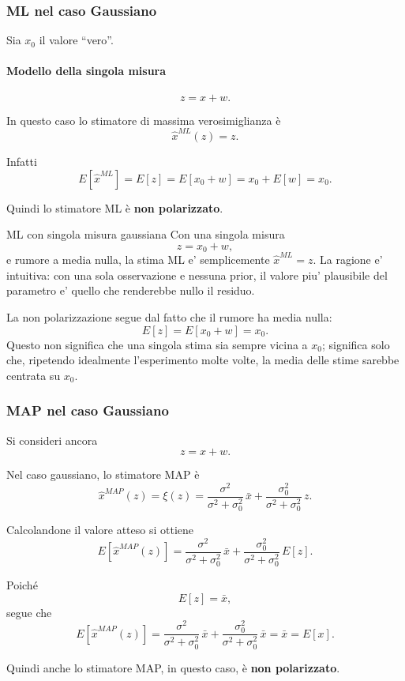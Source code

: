 \documentclass[11pt,a4paper]{article}
\begin{document}
\subsubsection*{ML nel caso Gaussiano}

Sia \(x_0\) il valore ``vero''.

\paragraph{Modello della singola misura}
\[
z=x+w.
\]

In questo caso lo stimatore di massima verosimiglianza è
\[
\hat x^{ML}(z)=z.
\]

Infatti
\[
E[\hat x^{ML}]
=
E[z]
=
E[x_0+w]
=
x_0+E[w]
=
x_0.
\]

Quindi lo stimatore ML è \textbf{non polarizzato}.

\begin{spiegazione}{ML con singola misura gaussiana}
Con una singola misura
\[
z=x_0+w,
\]
e rumore a media nulla, la stima ML e' semplicemente $\hat x^{ML}=z$. La ragione e' intuitiva: con una sola osservazione e nessuna prior, il valore piu' plausibile del parametro e' quello che renderebbe nullo il residuo.

La non polarizzazione segue dal fatto che il rumore ha media nulla:
\[
E[z]=E[x_0+w]=x_0.
\]
Questo non significa che una singola stima sia sempre vicina a $x_0$; significa solo che, ripetendo idealmente l'esperimento molte volte, la media delle stime sarebbe centrata su $x_0$.
\end{spiegazione}

\subsubsection*{MAP nel caso Gaussiano}

Si consideri ancora
\[
z=x+w.
\]

Nel caso gaussiano, lo stimatore MAP è
\[
\hat x^{MAP}(z)=\xi(z)
=
\frac{\sigma^2}{\sigma^2+\sigma_0^2}\,\bar x
+
\frac{\sigma_0^2}{\sigma^2+\sigma_0^2}\,z.
\]

Calcolandone il valore atteso si ottiene
\[
E[\hat x^{MAP}(z)]
=
\frac{\sigma^2}{\sigma^2+\sigma_0^2}\,\bar x
+
\frac{\sigma_0^2}{\sigma^2+\sigma_0^2}\,E[z].
\]

Poiché
\[
E[z]=\bar x,
\]
segue che
\[
E[\hat x^{MAP}(z)]
=
\frac{\sigma^2}{\sigma^2+\sigma_0^2}\,\bar x
+
\frac{\sigma_0^2}{\sigma^2+\sigma_0^2}\,\bar x
=
\bar x
=
E[x].
\]

Quindi anche lo stimatore MAP, in questo caso, è \textbf{non polarizzato}.
\end{document}
